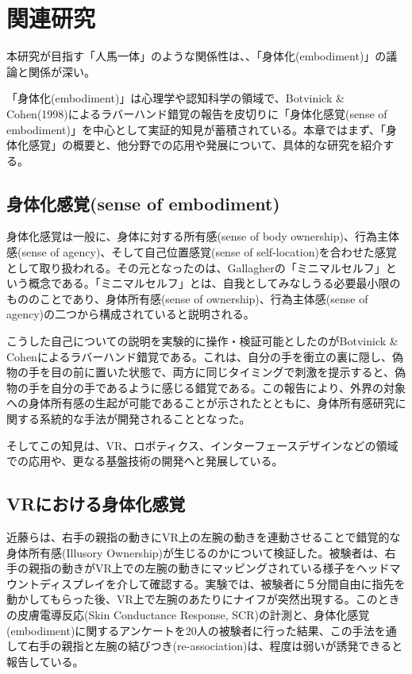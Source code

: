 \chapter{関連研究}
\label{related_works}

本研究が目指す「人馬一体」のような関係性は、、「身体化(embodiment)」の議論と関係が深い。

「身体化(embodiment)」は心理学や認知科学の領域で、Botvinick \& Cohen(1998)によるラバーハンド錯覚の報告を皮切りに「身体化感覚(sense of embodiment)」を中心として実証的知見が蓄積されている。本章ではまず、「身体化感覚」の概要と、他分野での応用や発展について、具体的な研究を紹介する。

\section{身体化感覚(sense of embodiment)}

身体化感覚は一般に、身体に対する所有感(sense of body ownership)、行為主体感(sense of agency)、そして自己位置感覚(sense of self-location)を合わせた感覚として取り扱われる\cite{kilteni2012}。その元となったのは、Gallagherの「ミニマルセルフ」という概念である。「ミニマルセルフ」とは、自我としてみなしうる必要最小限のもののことであり、身体所有感(sense of ownership)、行為主体感(sense of agency)の二つから構成されていると説明される\cite{Gallagher2000}。

こうした自己についての説明を実験的に操作・検証可能としたのがBotvinick
\& Cohenによるラバーハンド錯覚\cite{BotvinickCohen1998}である。これは、自分の手を衝立の裏に隠し、偽物の手を目の前に置いた状態で、両方に同じタイミングで刺激を提示すると、偽物の手を自分の手であるように感じる錯覚である。この報告により、外界の対象への身体所有感の生起が可能であることが示されたとともに、身体所有感研究に関する系統的な手法が開発されることとなった。

そしてこの知見は、VR、ロボティクス、インターフェースデザインなどの領域での応用や、更なる基盤技術の開発へと発展している。

\section{VRにおける身体化感覚}

近藤ら\cite{Kondo2020}は、右手の親指の動きにVR上の左腕の動きを連動させることで錯覚的な身体所有感(Illusory Ownership)が生じるのかについて検証した。被験者は、右手の親指の動きがVR上での左腕の動きにマッピングされている様子をヘッドマウントディスプレイを介して確認する。実験では、被験者に５分間自由に指先を動かしてもらった後、VR上で左腕のあたりにナイフが突然出現する。このときの皮膚電導反応(Skin Conductance Response, SCR)の計測と、身体化感覚(embodiment)に関するアンケートを20人の被験者に行った結果、この手法を通して右手の親指と左腕の結びつき(re-association)は、程度は弱いが誘発できると報告している。

